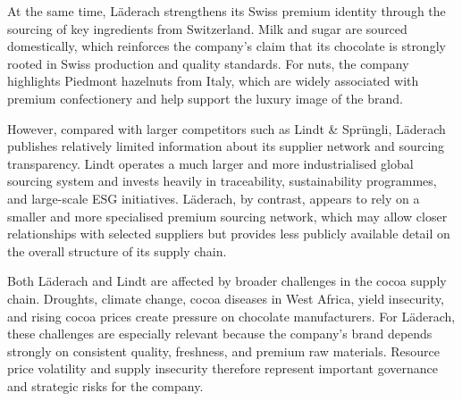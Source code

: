 At the same time, Läderach strengthens its Swiss premium identity through the
sourcing of key ingredients from Switzerland. Milk and sugar are sourced
domestically, which reinforces the company’s claim that its chocolate is strongly
rooted in Swiss production and quality standards. For nuts, the company highlights
Piedmont hazelnuts from Italy, which are widely associated with premium
confectionery and help support the luxury image of the brand.

However, compared with larger competitors such as Lindt \& Sprüngli, Läderach
publishes relatively limited information about its supplier network and sourcing
transparency. Lindt operates a much larger and more industrialised global sourcing
system and invests heavily in traceability, sustainability programmes, and
large-scale ESG initiatives. Läderach, by contrast, appears to rely on a smaller
and more specialised premium sourcing network, which may allow closer
relationships with selected suppliers but provides less publicly available detail
on the overall structure of its supply chain.

Both Läderach and Lindt are affected by broader challenges in the cocoa supply
chain. Droughts, climate change, cocoa diseases in West Africa, yield insecurity,
and rising cocoa prices create pressure on chocolate manufacturers. For Läderach,
these challenges are especially relevant because the company’s brand depends
strongly on consistent quality, freshness, and premium raw materials. Resource
price volatility and supply insecurity therefore represent important governance
and strategic risks for the company.